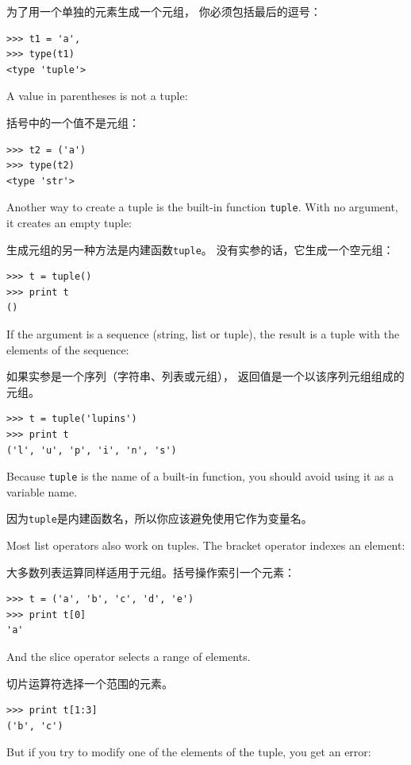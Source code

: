 \documentclass[10pt]{book}
\begin{document}
\begin{CJK}{UTF8}{gbsn}
为了用一个单独的元素生成一个元组，
你必须包括最后的逗号：

\begin{verbatim}
>>> t1 = 'a',
>>> type(t1)
<type 'tuple'>
\end{verbatim}
%
A value in parentheses is not a tuple:

括号中的一个值不是元组：

\begin{verbatim}
>>> t2 = ('a')
>>> type(t2)
<type 'str'>
\end{verbatim}
%
Another way to create a tuple is the built-in function {\tt tuple}.
With no argument, it creates an empty tuple:

生成元组的另一种方法是内建函数{\tt tuple}。
没有实参的话，它生成一个空元组：

\begin{verbatim}
>>> t = tuple()
>>> print t
()
\end{verbatim}
%
If the argument is a sequence (string, list or tuple), the result
is a tuple with the elements of the sequence:

如果实参是一个序列（字符串、列表或元组），
返回值是一个以该序列元组组成的元组。

\begin{verbatim}
>>> t = tuple('lupins')
>>> print t
('l', 'u', 'p', 'i', 'n', 's')
\end{verbatim}
%
Because {\tt tuple} is the name of a built-in function, you should
avoid using it as a variable name.

因为{\tt tuple}是内建函数名，所以你应该避免使用它作为变量名。

Most list operators also work on tuples.  The bracket operator
indexes an element:

大多数列表运算同样适用于元组。括号操作索引一个元素：

\begin{verbatim}
>>> t = ('a', 'b', 'c', 'd', 'e')
>>> print t[0]
'a'
\end{verbatim}
%
And the slice operator selects a range of elements.

切片运算符选择一个范围的元素。

\begin{verbatim}
>>> print t[1:3]
('b', 'c')
\end{verbatim}
%
But if you try to modify one of the elements of the tuple, you get
an error:


\end{CJK}
\end{document}
